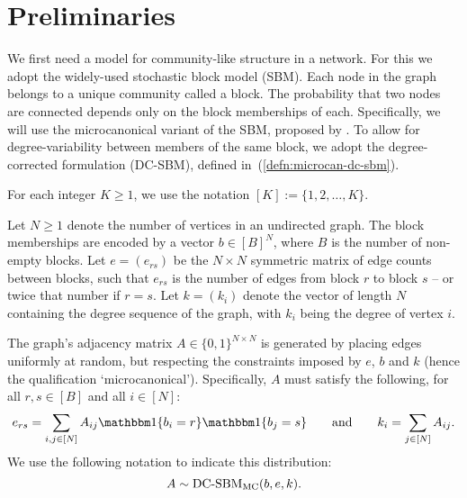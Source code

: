 \section{Preliminaries}

We first need a model for community-like structure in a network. For this we adopt the widely-used stochastic block model (SBM).
Each node in the graph belongs to a unique community called a block. The probability that two nodes are connected depends only on the block memberships of each. Specifically, we will use the microcanonical variant of the SBM, proposed by \citet{Peixoto-Bayesian-Microcanonical}. To allow for degree-variability between members of the same block, we adopt the degree-corrected formulation (DC-SBM), defined in~(\ref{defn:microcan-dc-sbm}).

For each integer $K\geq 1$, we use the notation $[K]:=\{1,2,\ldots,K\}$.

\begin{definition}
	\label{defn:microcan-dc-sbm}
	Let $N \geq 1$ denote the number of vertices in an undirected graph. The block memberships are encoded by a vector $b \in [B]^N$,
where $B$ is the number of non-empty blocks.
	Let $e=(e_{rs})$ be the $N\times N$ symmetric matrix of edge counts 
between blocks, such that $e_{rs}$ is the number of edges from block $r$ to 
block $s$ -- or twice that number if $r=s$. 
	Let $k =(k_i)$ denote the vector of length $N$ containing the degree
sequence of the graph, with $k_i$ being the degree of vertex $i$.

The graph's adjacency matrix $A \in \{0,1\}^{N \times N}$ is generated 
by placing edges uniformly at random, but respecting the constraints 
imposed by $e$, $b$ and $k$ (hence the qualification `microcanonical').
Specifically, $A$ must satisfy the following, for all $r,s\in[B]$
and all $i\in[N]$:
	\begin{equation}
		e_{rs} = \sum_{i, j \in [N]} A_{ij} 
	\one \{b_i = r\} \one \{b_j = s\} 
		\qquad 
		\textrm{and} \qquad
		k_i = \sum_{j \in [N]} A_{ij}.
		\label{eqn:sbm-constraints}
	\end{equation}
We use the following notation to indicate this distribution:
\begin{equation}
		A \sim \mbox{\rm DC-SBM}_{\rm MC} (b, e, k).
	\end{equation}
\end{definition}
